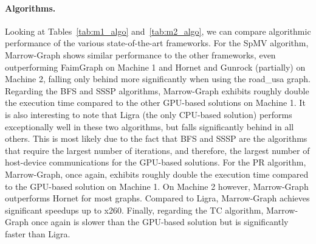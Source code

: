 



\paragraph{\textbf{Algorithms}.} Looking at Tables~\ref{tab:m1_algo} and~\ref{tab:m2_algo}, we can compare algorithmic performance of the various state-of-the-art frameworks. For the \gls{SpMV} algorithm, Marrow-Graph shows similar performance to the other frameworks, even outperforming FaimGraph on Machine 1 and Hornet and Gunrock (partially) on Machine 2, falling only behind more significantly when using the road\_usa graph. Regarding the \gls{BFS} and \gls{SSSP} algorithms, Marrow-Graph exhibits roughly double the execution time compared to the other \gls{GPU}-based solutions on Machine 1. It is also interesting to note that Ligra (the only \gls{CPU}-based solution) performs exceptionally well in these two algorithms, but falls significantly behind in all others. This is most likely due to the fact that \gls{BFS} and \gls{SSSP} are the algorithms that require the largest number of iterations, and therefore, the largest number of host-device communications for the \gls{GPU}-based solutions. For the \gls{PR} algorithm, Marrow-Graph, once again, exhibits roughly double the execution time compared to the \gls{GPU}-based solution on Machine 1. On Machine 2 however, Marrow-Graph outperforms Hornet for most graphs. Compared to Ligra, Marrow-Graph achieves significant speedups up to x260. Finally, regarding the \gls{TC} algorithm, Marrow-Graph once again is slower than the \gls{GPU}-based solution but is significantly faster than Ligra. 



